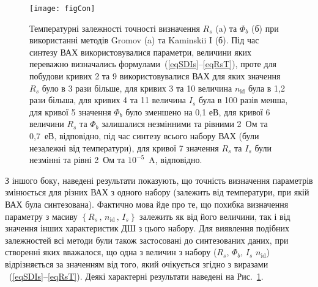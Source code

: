 \begin{figure}
\center
\texttt{[image: figCon]}%
\caption{\label{figCon}
Температурні залежності точності визначення $R_s$ (a) та $\Phi_b$ (б) при використанні методів Gromov (a) та  Kaminskii I (б).
Під час синтезу ВАХ використовувалися параметри, величини яких переважно визначались формулами~(\ref{eqSDIs}--\ref{eqRsT}),
проте для  побудови кривих 2 та 9 використовувалися ВАХ для яких значення $R_s$ було в 3 рази більше,
для кривих 3 та 10 величина $n_\mathrm{id}$ була в 1,2 рази більша,
для кривих 4 та 11 величина $I_s$ була в 100 разів менша,
для кривої 5 значення $\Phi_b$ було зменшено на 0,1 еВ,
для кривої 6 величини $R_s$ та $\Phi_b$ залишалися незмінними та рівними 2~Ом та 0,7~еВ, відповідно, під час синтезу всього
набору ВАХ (були незалежні від температури),
для кривої 7 значення $R_s$ та $I_s$ були незмінні та рівні 2~Ом та $10^{-5}$~A, відповідно.
}
\end{figure}

З іншого боку, наведені результати показують, що точність визначення параметрів змінюється для різних ВАХ з одного набору (залежить від температури, при якій ВАХ була синтезована).
Фактично мова йде про те, що похибка визначення параметру з масиву $\left\{R_s\,,\,n_\mathrm{id}\,,\, I_s\right\}$ залежить як від його величини, так і від значення інших характеристик ДШ з цього набору.
Для виявлення подібних залежностей всі методи були також застосовані до синтезованих даних, при створенні яких вважалося, що одна з величин з набору ($R_s$, $\Phi_b$, $I_s$ $n_\mathrm{id}$) відрізняється за значенням від того, який очікується згідно з виразами ~(\ref{eqSDIs}--\ref{eqRsT}).
Деякі характерні результати наведені на Рис.~\ref{figCon}.

